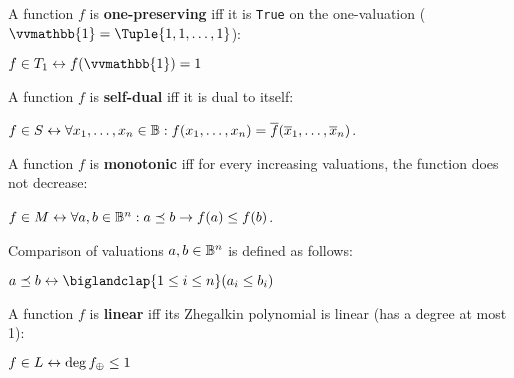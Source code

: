 \documentclass[a4paper,10pt]{article}
\begin{document}
\begin{terms}
    \item A function $f$ is \textbf{one-preserving} iff it is \texttt{True} on the one-valuation ($\vvmathbb{1} = \Tuple{1,1,\dotsc,1}$):
    \par\quad$f \in T_1 \iff f(\vvmathbb{1}) = 1$

    \item A function $f$ is \textbf{self-dual} iff it is dual to itself:
    \par\quad$f \in S \mathrel{\leftrightarrow} \forall x_1,\dotsc,x_n \in \mathbb{B} : f(x_1, \dotsc, x_n) = \overline{f}(\overline{x}_1, \dotsc, \overline{x}_n)$.

    \item A function $f$ is \textbf{monotonic} iff for every increasing valuations, the function does not decrease:
    \par\quad$f \in M \mathrel{\leftrightarrow} \forall a,b \in \mathbb{B}^n: a \preceq b \mathrel{\rightarrow} f(a) \leq f(b)$.

    Comparison of valuations $a,b \in \mathbb{B}^n$ is defined as follows:
    \par\quad$\displaystyle a \preceq b \iff \biglandclap{1 \leq i \leq n} (a_i \leq b_i)$

    \item A function $f$ is \textbf{linear} iff its Zhegalkin polynomial is linear (\ie has a degree at most 1):
    \par\quad$f \in L \mathrel{\leftrightarrow} \operatorname{deg} f_{\oplus} \leq 1$


\end{terms}


\end{document}
